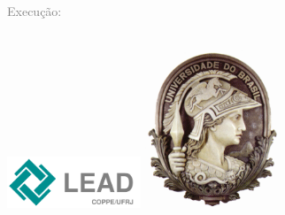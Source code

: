 





\thispagestyle{empty}


\hypersetup{pageanchor=false}

\vspace{4cm}

 \textcolor{gray}{Execução:} \\
\\
\begin{minipage}{\textwidth}
	\centering
	\includegraphics[width=0.3\textwidth]{logo/lead-logo}
    \hspace{0.5cm}
	\includegraphics[width=0.3\textwidth,
    height=0.2\textwidth,keepaspectratio]{logo/minerva07}
	
\end{minipage}

\vspace{2cm}

